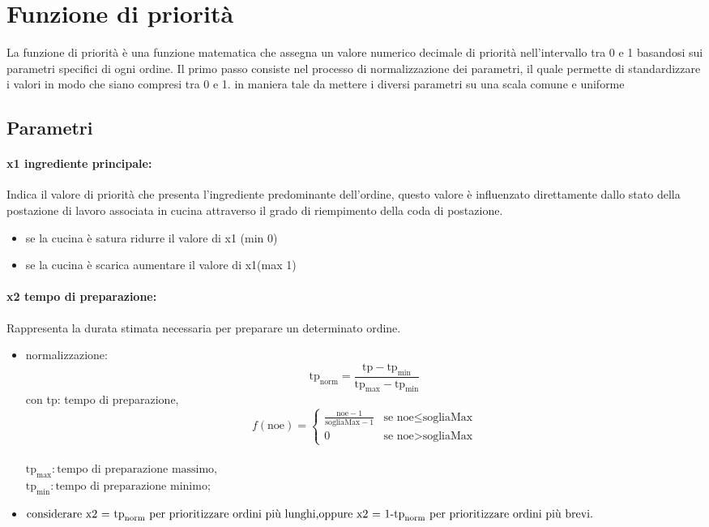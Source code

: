 \section{Funzione di priorità}
La funzione di priorità è una funzione matematica che assegna un valore numerico decimale di priorità nell’intervallo tra 0 e 1 basandosi sui parametri specifici di ogni ordine.
Il primo passo consiste nel processo di normalizzazione dei parametri, il quale permette di standardizzare i valori in modo che siano compresi tra 0 e 1. in maniera tale da mettere i diversi parametri su una scala comune e uniforme

\subsection{Parametri}

\paragraph{x1 ingrediente principale:}
Indica il valore di priorità che presenta l'ingrediente predominante dell’ordine, questo valore è influenzato direttamente dallo stato della postazione di lavoro associata in cucina attraverso il grado di riempimento della coda di postazione.
\begin{itemize}
	\item se la cucina è satura ridurre il valore di x1 (min 0)
	\item se la cucina è scarica aumentare il valore di x1(max 1)
\end{itemize}

\paragraph{x2 tempo di preparazione:}
Rappresenta la durata stimata necessaria per preparare un determinato ordine.
\begin{itemize}
	\item normalizzazione: \begin{equation*}
		\text{tp}_{\text{norm}} = \frac{\text{tp} - \text{tp}_{\text{min}}}{\text{tp}_{\text{max}} - \text{tp}_{\text{min}}}
	\end{equation*} con tp: tempo di preparazione,\\

	\[ f(\text{noe}) = \begin{cases} \frac{{\text{noe} - 1}}{{\text{sogliaMax} - 1}} & \text{se } \text{noe} \leq \text{sogliaMax} \\ 0 & \text{se } \text{noe} > \text{sogliaMax} \end{cases} \]\\

	$\text{tp}_{\text{max}}: \text{tempo di preparazione massimo,}$\\
	$\text{tp}_{\text{min}}: \text{tempo di preparazione minimo;}$
	\item $\text{considerare x2 = tp}_{\text{norm}} \text{ per prioritizzare ordini più lunghi,}\\ \text{oppure x2 = 1-tp}_{\text{norm}} \text{ per prioritizzare ordini più brevi.}$
\end{itemize}

